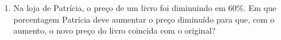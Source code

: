 \documentclass[a4paper,14pt]{article}
\begin{document}
\begin{multicols}{2}
\begin{enumerate}
			\item Na loja de Patrícia, o preço de um livro foi diminuindo em 60\%. Em que porcentagem Patrícia deve aumentar o preço diminuído para que, com o aumento, o novo preço do livro coincida com o original?
		\end{enumerate}
		$~$ \\ $~$ \\ $~$ \\ $~$ \\ $~$ \\ $~$ \\ $~$ \\ $~$ \\ $~$ \\ $~$ \\ $~$ \\ $~$ \\ $~$ \\ $~$ \\ $~$ \\ $~$ \\ $~$ \\ $~$ \\ $~$ \\ $~$ \\ $~$ \\ $~$ \\ $~$ \\ $~$ \\ $~$ \\ $~$ \\ $~$ \\ $~$ \\ $~$ \\ $~$ \\ $~$ \\ $~$ \\ $~$ \\ $~$ \\ $~$ \\ $~$ \\ $~$ \\ $~$ \\ $~$ \\ $~$ \\ $~$ \\ $~$ \\ $~$ \\ $~$ \\ $~$ \\ $~$ \\ $~$ \\ $~$ \\ $~$ \\ $~$ \\ $~$ \\ $~$ \\ $~$ \\ $~$ \\ $~$ \\ $~$ \\ $~$
	\end{multicols}
\end{document}
